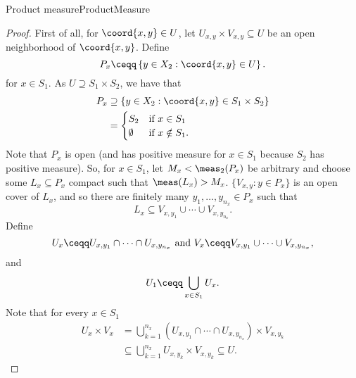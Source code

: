 \begin{thm}{Product measure}{ProductMeasure}
\begin{proof}
First of all, for $\coord{x,y}\in U$, let $U_{x,y}\times V_{x,y}\subseteq U$ be an open neighborhood of $\coord{x,y}$.  Define
\begin{equation}
P_x\ceqq \left\{ y\in X_2:\coord{x,y}\in U\right\} .
\end{equation}
for $x\in S_1$.  As $U\supseteq S_1\times S_2$, we have that
\begin{equation}
\begin{split}
P_x & \supseteq \left\{ y\in X_2:\coord{x,y}\in S_1\times S_2\right\} \\
& =\begin{cases}S_2 & \text{if }x\in S_1 \\ \emptyset & \text{if }x\notin S_1.\end{cases}
\end{split}
\end{equation}
Note that $P_x$ is open (and has positive measure for $x\in S_1$ because $S_2$ has positive measure).  So, for $x\in S_1$, let $M_x<\meas _2(P_x)$ be arbitrary and choose some $L_x\subseteq P_x$ compact such that $\meas (L_x)>M_x$.  $\{ V_{x,y}:y\in P_x\}$ is an open cover of $L_x$, and so there are finitely many $y_1,\ldots ,y_{n_x}\in P_x$ such that
\begin{equation}
L_x\subseteq V_{x,y_1}\cup \cdots \cup V_{x,y_{n_x}}.
\end{equation}
Define
\begin{equation}
U_x\ceqq U_{x,y_1}\cap \cdots \cap U_{x,y_{n_x}}\text{ and }V_x\ceqq V_{x,y_1}\cup \cdots \cup V_{x,y_{n_x}},
\end{equation}
and
\begin{equation}
U_1\ceqq \bigcup _{x\in S_1}U_x.
\end{equation}
Note that for every $x\in S_1$
\begin{equation}\label{eqn5.2.45}
\begin{split}
U_x\times V_x & =\bigcup _{k=1}^{n_x}\left( U_{x,y_1}\cap \cdots \cap U_{x,y_{n_x}}\right) \times V_{x,y_k} \\
& \subseteq \bigcup _{k=1}^{n_x}U_{x,y_k}\times V_{x,y_k}\subseteq U.
\end{split}
\end{equation}


\end{proof}
\end{thm}
